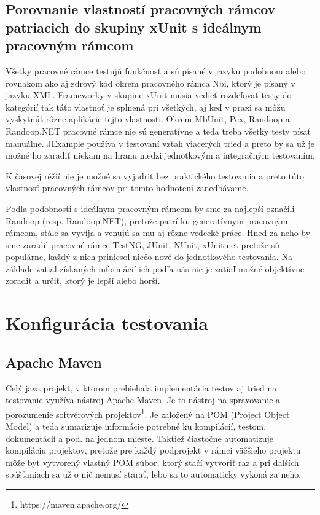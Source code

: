 \documentclass[11pt,twoside,slovak,a4paper]{article}
\begin{document}
	\subsection{Porovnanie vlastností pracovných rámcov patriacich do skupiny xUnit s ideálnym pracovným rámcom}
	
	Všetky pracovné rámce testujú funkčnosť a sú písané v jazyku podobnom alebo rovnakom ako aj zdrový kód okrem pracovného rámca Nbi, ktorý je písaný v jazyku XML. Frameworky v skupine xUnit musia vedieť rozdeľovať testy do kategórií tak táto vlastnoť je splnená pri všetkých, aj keď v praxi sa môžu vyskytnúť rôzne aplikácie tejto vlastnosti.
	Okrem MbUnit, Pex, Randoop a Randoop.NET pracovné rámce nie sú generatívne a teda treba všetky testy písať manuálne.
	JExample používa v testovaní vzťah viacerých tried a preto by sa už je možné ho zaradiť niekam na hranu medzi jednotkovým a integračným testovaním.
	
	K časovej réžií nie je možné sa vyjadriť bez praktického testovania a preto túto vlastnosť pracovných rámcov pri tomto hodnotení zanedbávame.
	
	Podľa podobnosti s ideálnym pracovným rámcom by sme za najlepší označili Randoop (resp. Randoop.NET), pretože patrí ku generatívnym pracovným rámcom, stále sa vyvíja a venujú sa mu aj rôzne vedecké práce. Hneď za neho by sme zaradil pracovné rámce TestNG, JUnit, NUnit, xUnit.net pretože sú populárne, každý z nich priniesol niečo nové do jednotkového testovania. Na základe zatiaľ získaných informácií ich podľa nás nie je zatiaľ možné objektívne zoradiť a určiť, ktorý je lepší alebo horší.
	
	\newpage
	
	\section{Konfigurácia testovania}
	
	\subsection{Apache Maven}
	
	Celý java projekt, v ktorom prebiehala implementácia testov aj tried na testovanie využíva nástroj Apache Maven. Je to nástroj na spravovanie a porozumenie softvérových projektov\footnote{https://maven.apache.org/}. Je založený na POM (Project Object Model) a teda sumarizuje informácie potrebné ku kompilácií, testom, dokumentácií a pod. na jednom mieste. Taktiež čiastočne automatizuje kompiláciu projektov, pretože pre každý podprojekt v rámci väčšieho projektu môže byť vytvorený vlastný POM súbor, ktorý stačí vytvoriť raz a pri ďalších spúšťaniach sa už o nič nemusí starať, lebo sa to automaticky vykoná za neho.
	
\end{document}
